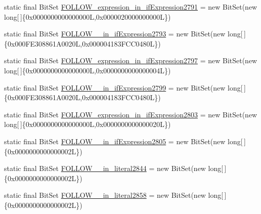 \begin{DoxyCompactItemize}
\item 
static final Bit\-Set \hyperlink{classorg_1_1tzi_1_1use_1_1parser_1_1testsuite_1_1_test_suite_parser_a37677e98ce12abb54788eb8c0c12e3b8}{F\-O\-L\-L\-O\-W\-\_\-expression\-\_\-in\-\_\-if\-Expression2791} = new Bit\-Set(new long\mbox{[}$\,$\mbox{]}\{0x0000000000000000\-L,0x0000020000000000\-L\})
\item 
static final Bit\-Set \hyperlink{classorg_1_1tzi_1_1use_1_1parser_1_1testsuite_1_1_test_suite_parser_a2048bf978d824582ddd8acdb384c75b4}{F\-O\-L\-L\-O\-W\-\_\-\_\-in\-\_\-if\-Expression2793} = new Bit\-Set(new long\mbox{[}$\,$\mbox{]}\{0x000\-F\-E308861\-A0020\-L,0x000004183\-F\-C\-C0480\-L\})
\item 
static final Bit\-Set \hyperlink{classorg_1_1tzi_1_1use_1_1parser_1_1testsuite_1_1_test_suite_parser_a955678dc39e464ca0c50d88392473903}{F\-O\-L\-L\-O\-W\-\_\-expression\-\_\-in\-\_\-if\-Expression2797} = new Bit\-Set(new long\mbox{[}$\,$\mbox{]}\{0x0000000000000000\-L,0x0000000000000004\-L\})
\item 
static final Bit\-Set \hyperlink{classorg_1_1tzi_1_1use_1_1parser_1_1testsuite_1_1_test_suite_parser_aeb768163a169191a4b4ac8f5c8408e54}{F\-O\-L\-L\-O\-W\-\_\-\_\-in\-\_\-if\-Expression2799} = new Bit\-Set(new long\mbox{[}$\,$\mbox{]}\{0x000\-F\-E308861\-A0020\-L,0x000004183\-F\-C\-C0480\-L\})
\item 
static final Bit\-Set \hyperlink{classorg_1_1tzi_1_1use_1_1parser_1_1testsuite_1_1_test_suite_parser_a5b163a617087585f0d4423521c64a805}{F\-O\-L\-L\-O\-W\-\_\-expression\-\_\-in\-\_\-if\-Expression2803} = new Bit\-Set(new long\mbox{[}$\,$\mbox{]}\{0x0000000000000000\-L,0x0000000000000020\-L\})
\item 
static final Bit\-Set \hyperlink{classorg_1_1tzi_1_1use_1_1parser_1_1testsuite_1_1_test_suite_parser_a7ab492cd393e8dff4d74a64b3e163c3b}{F\-O\-L\-L\-O\-W\-\_\-\_\-in\-\_\-if\-Expression2805} = new Bit\-Set(new long\mbox{[}$\,$\mbox{]}\{0x0000000000000002\-L\})
\item 
static final Bit\-Set \hyperlink{classorg_1_1tzi_1_1use_1_1parser_1_1testsuite_1_1_test_suite_parser_a856a949069527e040dc0b91fe0a63bff}{F\-O\-L\-L\-O\-W\-\_\-\_\-in\-\_\-literal2844} = new Bit\-Set(new long\mbox{[}$\,$\mbox{]}\{0x0000000000000002\-L\})
\item 
static final Bit\-Set \hyperlink{classorg_1_1tzi_1_1use_1_1parser_1_1testsuite_1_1_test_suite_parser_a7e9082eb4ca3c2a2ed445a905a749129}{F\-O\-L\-L\-O\-W\-\_\-\_\-in\-\_\-literal2858} = new Bit\-Set(new long\mbox{[}$\,$\mbox{]}\{0x0000000000000002\-L\})

\end{DoxyCompactItemize}
